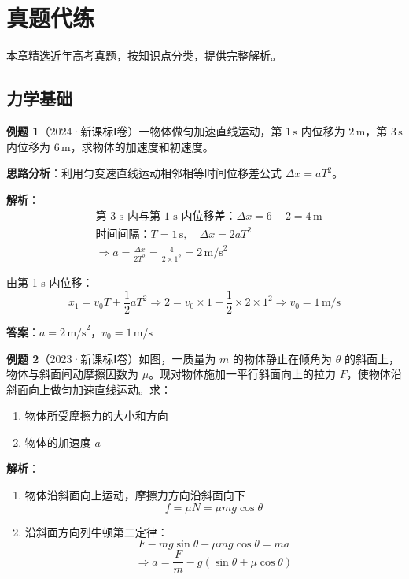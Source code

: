 \section{真题代练}

本章精选近年高考真题，按知识点分类，提供完整解析。

\subsection{力学基础}

\textbf{例题 1}（2024·新课标Ⅰ卷）一物体做匀加速直线运动，第 $1\,\text{s}$ 内位移为 $2\,\text{m}$，第 $3\,\text{s}$ 内位移为 $6\,\text{m}$，求物体的加速度和初速度。

\textbf{思路分析}：利用匀变速直线运动相邻相等时间位移差公式 $\Delta x = aT^2$。

\textbf{解析}：
\[
\begin{aligned}
&\text{第 3 s 内与第 1 s 内位移差：} \Delta x = 6 - 2 = 4\,\text{m} \\
&\text{时间间隔：} T = 1\,\text{s},\quad \Delta x = 2aT^2 \\
&\Rightarrow a = \frac{\Delta x}{2T^2} = \frac{4}{2\times1^2} = 2\,\text{m/s}^2
\end{aligned}
\]

由第 1 s 内位移：
\[
x_1 = v_0T + \frac12 aT^2 \Rightarrow 2 = v_0 \times 1 + \frac12 \times 2 \times 1^2 \Rightarrow v_0 = 1\,\text{m/s}
\]

\textbf{答案}：$a = 2\,\text{m/s}^2$，$v_0 = 1\,\text{m/s}$

\vspace{1em}

\textbf{例题 2}（2023·新课标Ⅰ卷）如图，一质量为 $m$ 的物体静止在倾角为 $\theta$ 的斜面上，物体与斜面间动摩擦因数为 $\mu$。现对物体施加一平行斜面向上的拉力 $F$，使物体沿斜面向上做匀加速直线运动。求：
\begin{enumerate}
  \item 物体所受摩擦力的大小和方向
  \item 物体的加速度 $a$
\end{enumerate}

\textbf{解析}：
\begin{enumerate}
  \item 物体沿斜面向上运动，摩擦力方向沿斜面向下
  \[
  f = \mu N = \mu mg\cos\theta
  \]
  \item 沿斜面方向列牛顿第二定律：
  \[
  F - mg\sin\theta - \mu mg\cos\theta = ma
  \]
  \[
  \Rightarrow a = \frac{F}{m} - g(\sin\theta + \mu\cos\theta)
  \]
\end{enumerate}

